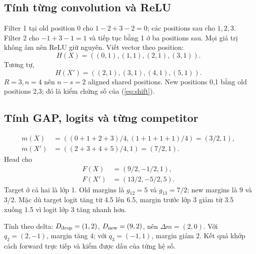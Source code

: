 \documentclass[11pt,a4paper]{article}
\theoremstyle{definition}
\begin{document}
\subsection{Tính từng convolution và ReLU}
Filter 1 tại old position 0 cho $1-2+3-2=0$; các positions sau cho
$1,2,3$. Filter 2 cho $-1+3-1=1$ và tiếp tục bằng 1 ở ba positions sau.
Mọi giá trị không âm nên ReLU giữ nguyên. Viết vector theo position:
\begin{equation}
H(X)=((0,1),(1,1),(2,1),(3,1)).
\end{equation}
Tương tự,
\begin{equation}
H(X')=((2,1),(3,1),(4,1),(5,1)).
\end{equation}
$R=3,n=4$ nên $n-s=2$ aligned shared positions. New positions 0,1 bằng
old positions 2,3; đó là kiểm chứng số của (\ref{eq:shift}).

\subsection{Tính GAP, logits và từng competitor}
\begin{align}
m(X)&=((0+1+2+3)/4,(1+1+1+1)/4)=(3/2,1),\\
m(X')&=((2+3+4+5)/4,1)=(7/2,1).
\end{align}
Head cho
\begin{align}
F(X)&=(9/2,-1/2,1),\\
F(X')&=(13/2,-5/2,5).
\end{align}
Target ở cả hai là lớp 1. Old margins là $g_{12}=5$ và $g_{13}=7/2$;
new margins là $9$ và $3/2$. Mặc dù target logit tăng từ 4.5 lên 6.5,
margin trước lớp 3 giảm từ 3.5 xuống 1.5 vì logit lớp 3 tăng nhanh hơn.

Tính theo delta: $D_{\rm drop}=(1,2)$,
$D_{\rm new}=(9,2)$, nên $\Delta m=(2,0)$. Với
$q_2=(2,-1)$, margin tăng $4$; với $q_3=(-1,1)$, margin giảm $2$.
Kết quả khớp cách forward trực tiếp và kiểm được dấu của từng hệ số.
\end{document}
